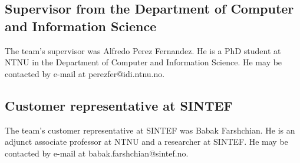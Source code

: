 \subsection{Supervisor from the Department of Computer and Information Science}
The team's supervisor was Alfredo Perez Fernandez. He is a PhD student at NTNU in the Department of Computer and Information Science. He may be contacted by e-mail at perezfer@idi.ntnu.no.

\subsection{Customer representative at SINTEF}
The team's customer representative at SINTEF was Babak Farshchian. He is an adjunct associate professor at NTNU and a researcher at SINTEF. He may be contacted by e-mail at babak.farshchian@sintef.no.
